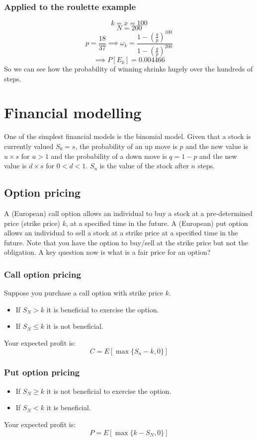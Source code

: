 \documentclass[12pt]{article}
\begin{document}
\subsubsection*{Applied to the roulette example}
\[k=x=100\]
\[N=200\]
\[p=\frac{18}{37}\implies \omega_k=\frac{1-\left(\frac{q}{p}\right)^{100}}{1-\left(\frac{q}{p}\right)^{200}}\]
\[\implies P[E_k]=0.004466\]
So we can see how the probability of winning shrinks hugely over the hundreds of steps.
\section*{Financial modelling}
One of the simplest financial models is the binomial model. Given that a stock is currently valued \(S_0=s\), the probability of an up move is \(p\) and the new value is \(u\times s\) for \(u>1\) and the probability of a down move is \(q=1-p\) and the new value is \(d\times s\) for \(0<d<1\). \(S_n\) is the value of the stock after \(n\) steps.
\subsection*{Option pricing}
A (European) call option allows an individual to buy a stock at a pre-determined price (strike price) \(k\), at a specified time in the future. A (European) put option allows an individual to sell a stock at a strike price at a specified time in the future. Note that you have the option to buy/sell at the strike price but not the obligation. A key question now is what is a fair price for an option?
\subsubsection*{Call option pricing}
Suppose you purchase a call option with strike price \(k\).
\begin{itemize}
    \item If \(S_N> k\) it is beneficial to exercise the option.
    \item If \(S_N\leq k\) it is not beneficial.
\end{itemize}
Your expected profit is:
\[C=E[\max\{S_n-k,0\}]\]
\subsubsection*{Put option pricing}
\begin{itemize}
    \item If \(S_N\geq k\) it is not beneficial to exercise the option.
    \item If \(S_N<k\) it is beneficial.
\end{itemize}
Your expected profit is:
\[P=E[\max\{k-S_N,0\}]\]
\end{document}
